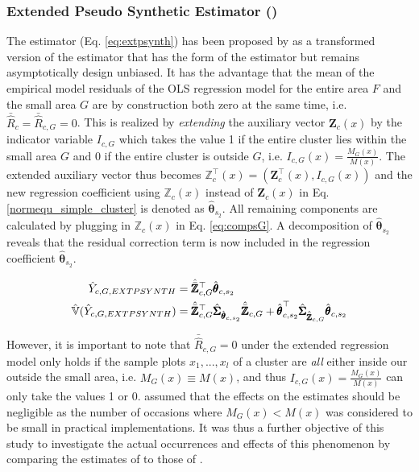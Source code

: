 \subsubsection{Extended Pseudo Synthetic Estimator (\extpsynth{})}
\label{sec:extpsynth}

The \extpsynth{} estimator (Eq. \ref{eq:extpsynth}) has been proposed by \cite{mandallaz2013a} as a transformed version of the \psmall{} estimator that has the form of the \psynth{} estimator but remains asymptotically design unbiased. It has the advantage that the mean of the empirical model residuals of the OLS regression model for the entire area $F$ and the small area $G$ are by construction both zero at the same time, i.e. $\bar{\hat{R}}_{c} = \bar{\hat{R}}_{c,G} = 0$. This is realized by \textit{extending} the auxiliary vector $\pmb{Z}_{c}(x)$ by the indicator variable $I_{c,G}$ which takes the value 1 if the entire cluster lies within the small area $G$ and 0 if the entire cluster is outside $G$, i.e. $I_{c,G}(x)=\frac{M_{G}(x)}{M(x)}$. The extended auxiliary vector thus becomes $\pmb{\mathbb{Z}}_{c}^{\top}(x)= (\pmb{Z}_{c}^{\top}(x),I_{c,G}(x))$ and the new regression coefficient using $\pmb{\mathbb{Z}}_{c}(x)$ instead of $\pmb{Z}_{c}(x)$ in Eq. \ref{normequ_simple_cluster} is denoted as $\hat{\pmb{\theta}}_{s_2}$. All remaining components are calculated by plugging in $\pmb{\mathbb{Z}}_{c}(x)$ in Eq. \ref{eq:compsG}. A decomposition of $\hat{\pmb{\theta}}_{s_2}$ reveals that the residual correction term is now included in the regression coefficient $\hat{\pmb{\theta}}_{s_2}$.

\begin{subequations}\label{eq:extpsynth}
	\begin{align}
	\hat{Y}_{c,G,EXTPSYNTH} & =\hat{\bar{\pmb{\mathbb{Z}}}}_{c,G}^{\top}\hat{\pmb{\theta}}_{c,s_2} \label{eq:extpsynth_pest} \\
	\hat{\mathbb{V}}(\hat{Y}_{c,G,EXTPSYNTH})& =
	\hat{\bar{\pmb{\mathbb{Z}}}}_{c,G}^{\top}\hat{\pmb{\Sigma}}_{\hat{\pmb{\theta}}_{c,s_2}}
	\hat{\bar{\pmb{\mathbb{Z}}}}_{c,G}
	+ \hat{\pmb{\theta}}^{\top}_{c,s_2}\hat{\pmb{\Sigma}}_{\hat{\bar{\pmb{\mathbb{Z}}}}_{c,G}}\hat{\pmb{\theta}}_{c,s_2} \label{eq:extpsynth_var}
	\end{align}
\end{subequations}

However, it is important to note that $\bar{\hat{R}}_{c,G} = 0$ under the extended regression model only holds if the sample plots $x_1, ..., x_l$ of a cluster are \textit{all} either inside our outside the small area, i.e. $M_G(x)\equiv M(x)$, and thus $I_{c,G}(x)=\frac{M_{G}(x)}{M(x)}$ can only take the values 1 or 0. \citet{mandallaz2016} assumed that the effects on the estimates should be negligible as the number of occasions where $M_{G}(x) < M(x)$ was considered to be small in practical implementations. It was thus a further objective of this study to investigate the actual occurrences and effects of this phenomenon by comparing the estimates of \extpsynth{} to those of \psmall{}. %

